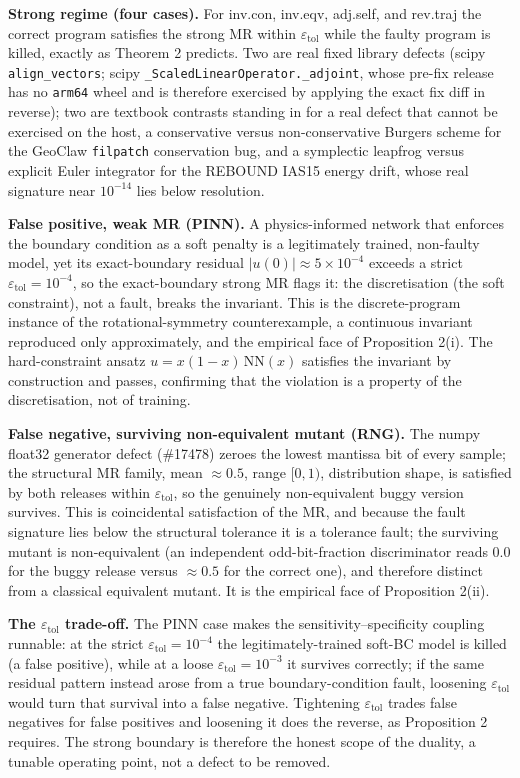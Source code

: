 \documentclass[acmsmall,screen,review]{acmart}
\begin{document}
\textbf{Strong regime (four cases).} For inv.con, inv.eqv, adj.self, and
rev.traj the correct program satisfies the strong MR within
$\varepsilon_{\mathrm{tol}}$ while the faulty program is killed, exactly
as Theorem 2 predicts. Two are real fixed library defects (scipy
\texttt{align\_vectors}; scipy \texttt{\_ScaledLinearOperator.\_adjoint},
whose pre-fix release has no \texttt{arm64} wheel and is therefore
exercised by applying the exact fix diff in reverse); two are textbook
contrasts standing in for a real defect that cannot be exercised on the
host, a conservative versus non-conservative Burgers scheme for the
GeoClaw \texttt{filpatch} conservation bug, and a symplectic leapfrog
versus explicit Euler integrator for the REBOUND IAS15 energy drift, whose
real signature near $10^{-14}$ lies below resolution.

\textbf{False positive, weak MR (PINN).} A physics-informed network
that enforces the boundary condition as a soft penalty is a legitimately
trained, non-faulty model, yet its exact-boundary residual
$|u(0)| \approx 5\times10^{-4}$ exceeds a strict
$\varepsilon_{\mathrm{tol}} = 10^{-4}$, so the exact-boundary strong MR
flags it: the discretisation (the soft constraint), not a fault, breaks
the invariant. This is the discrete-program instance of the
rotational-symmetry counterexample, a continuous invariant reproduced
only approximately, and the empirical face of Proposition 2(i). The
hard-constraint ansatz $u = x(1-x)\,\mathrm{NN}(x)$ satisfies the invariant
by construction and passes, confirming that the violation is a property of
the discretisation, not of training.

\textbf{False negative, surviving non-equivalent mutant (RNG).} The
numpy float32 generator defect (\#17478) zeroes the lowest mantissa bit of
every sample; the structural MR family, mean $\approx 0.5$, range
$[0,1)$, distribution shape, is satisfied by both releases within
$\varepsilon_{\mathrm{tol}}$, so the genuinely non-equivalent buggy version
survives. This is coincidental satisfaction of the MR, and because the
fault signature lies below the structural tolerance it is a tolerance
fault; the surviving mutant is non-equivalent (an independent
odd-bit-fraction discriminator reads $0.0$ for the buggy release versus
$\approx 0.5$ for the correct one), and therefore distinct from a
classical equivalent mutant. It is the empirical face of Proposition
2(ii).

\textbf{The $\varepsilon_{\mathrm{tol}}$ trade-off.} The PINN case makes
the sensitivity--specificity coupling runnable: at the strict
$\varepsilon_{\mathrm{tol}} = 10^{-4}$ the legitimately-trained soft-BC
model is killed (a false positive), while at a loose
$\varepsilon_{\mathrm{tol}} = 10^{-3}$ it survives correctly; if the same
residual pattern instead arose from a true boundary-condition fault,
loosening $\varepsilon_{\mathrm{tol}}$ would turn that survival into a
false negative. Tightening
$\varepsilon_{\mathrm{tol}}$ trades false negatives for false positives and
loosening it does the reverse, as Proposition 2 requires. The strong
boundary is therefore the honest scope of the duality, a tunable
operating point, not a defect to be removed.
\end{document}
